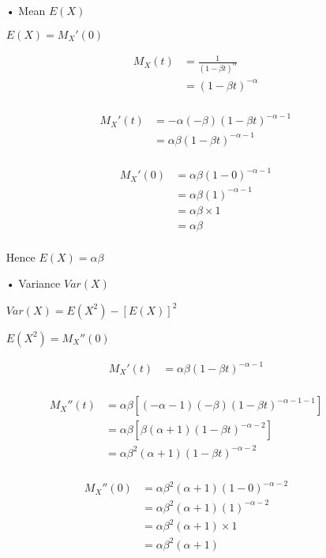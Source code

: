 \documentclass[11pt]{article}
\begin{document}
\begin{itemize}
	\item[•]Mean $E(X)$
	
	
	$E(X)=M_X'(0)$
	
\begin{align*}
M_X(t)  
&=\frac{1}{(1-\beta t)^\alpha} \\
&=(1-\beta t)^{-\alpha} \\	
\end{align*}
	
\begin{align*}
M_X'(t)
&=-\alpha(-\beta)(1-\beta t)^{-\alpha-1} \\
&=\alpha \beta (1-\beta t)^{-\alpha-1} \\	
\end{align*}
	

\begin{align*}
M_X'(0)  
&=\alpha \beta (1-0)^{-\alpha-1} \\
&=\alpha \beta (1)^{-\alpha-1} \\
&=\alpha \beta \times 1 \\
&=\alpha \beta \\
\end{align*}
	
	
	Hence $E(X)=\alpha \beta$
	
	\item[•]Variance $Var(X)$
	
	$Var(X)=E(X^2)-[E(X)]^2$
	
	$E(X^2)=M_X''(0)$
\end{itemize}

\begin{align*}
	M_X'(t)  
	&=\alpha \beta (1-\beta t)^{-\alpha-1} \\
\end{align*}

\begin{align*}
M_X''(t)  
&=\alpha \beta[(-\alpha-1)(-\beta)(1-\beta t)^{-\alpha-1-1}]\\
&=\alpha \beta[\beta(\alpha+1)(1-\beta t)^{-\alpha-2}]\\
&=\alpha \beta ^2(\alpha+1)(1-\beta t)^{-\alpha-2}\\
\end{align*}


\begin{align*}
M_X''(0)  
&=\alpha \beta^2(\alpha+1)(1-0)^{-\alpha-2}\\&=\alpha \beta^2(\alpha+1)(1)^{-\alpha-2}\\
&=\alpha \beta^2(\alpha+1)\times 1\\
&=\alpha \beta^2(\alpha+1)\\
\end{align*}
\end{document}
